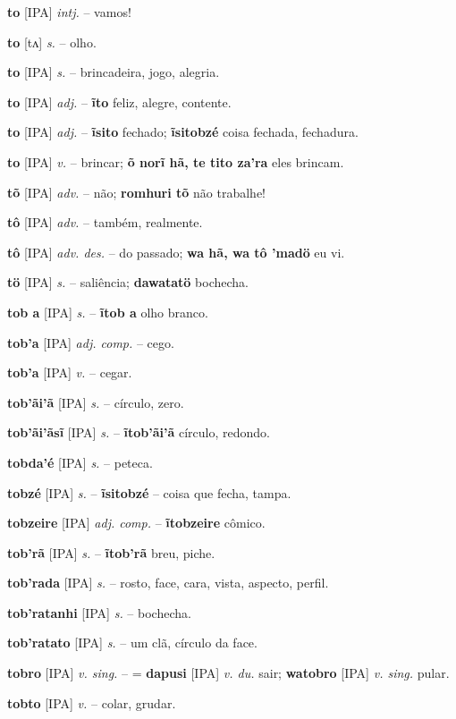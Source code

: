 \textbf{to} [IPA] \textit{intj.} -- vamos!

\textbf{to} [tʌ] \textit{s.} -- olho.

\textbf{to} [IPA] \textit{s.} -- brincadeira, jogo, alegria.

\textbf{to} [IPA] \textit{adj.} -- \textbf{ĩto} feliz, alegre, contente.

\textbf{to} [IPA] \textit{adj.} -- \textbf{ĩsito} fechado; \textbf{ĩsitobzé} coisa fechada, fechadura.

\textbf{to} [IPA] \textit{v.} -- brincar; \textbf{õ norĩ hã, te tito za'ra} eles brincam.

\textbf{tõ} [IPA] \textit{adv.} -- não; \textbf{romhuri tõ} não trabalhe!

\textbf{tô} [IPA] \textit{adv.} -- também, realmente.

\textbf{tô} [IPA] \textit{adv. des.} -- do passado; \textbf{wa hã, wa tô 'madö} eu vi.

\textbf{tö} [IPA] \textit{s.} -- saliência; \textbf{dawatatö} bochecha.

\textbf{tob a} [IPA] \textit{s.} -- \textbf{ĩtob a} olho branco.

\textbf{tob'a} [IPA] \textit{adj. comp.} -- cego.

\textbf{tob'a} [IPA] \textit{v.} -- cegar.

\textbf{tob'ãi'ã} [IPA] \textit{s.} -- círculo, zero.

\textbf{tob'ãi'ãsĩ} [IPA] \textit{s.} -- \textbf{ĩtob'ãi'ã} círculo, redondo.

\textbf{tobda'é} [IPA] \textit{s.} -- peteca.

\textbf{tobzé} [IPA] \textit{s.} -- \textbf{ĩsitobzé} -- coisa que fecha, tampa.

\textbf{tobzeire} [IPA] \textit{adj. comp.} -- \textbf{ĩtobzeire} cômico.

\textbf{tob'rã} [IPA] \textit{s.} -- \textbf{ĩtob'rã} breu, piche.

\textbf{tob'rada} [IPA] \textit{s.} -- rosto, face, cara, vista, aspecto, perfil.

\textbf{tob'ratanhi} [IPA] \textit{s.} -- bochecha.

\textbf{tob'ratato} [IPA] \textit{s.} -- um clã, círculo da face.

\textbf{tobro} [IPA] \textit{v. sing.} -- = \textbf{dapusi} [IPA] \textit{v. du.} sair; \textbf{watobro} [IPA] \textit{v. sing.} pular.

\textbf{tobto} [IPA] \textit{v.} -- colar, grudar.

